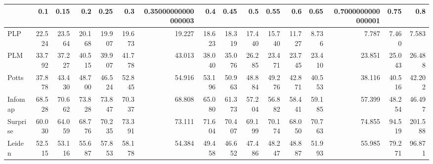\begin{tabular}{lrrrrrrrrrrrrrrr}
\toprule
{} &    0.1 &   0.15 &    0.2 &   0.25 &    0.3 & 0.35000000000000003 &    0.4 &   0.45 &    0.5 &   0.55 &    0.6 &   0.65 & 0.7000000000000001 &   0.75 &     0.8 \\
\midrule
PLP      & 22.524 & 23.564 & 20.168 & 19.907 & 19.673 &              19.227 & 18.623 & 18.319 & 17.440 & 15.740 & 11.727 &  8.736 &              7.787 &  7.460 &   7.583 \\
PLM      & 33.792 & 37.227 & 40.515 & 39.907 & 41.778 &              43.013 & 38.040 & 35.076 & 26.285 & 23.471 & 23.745 & 23.410 &             23.851 & 25.043 &  26.488 \\
Potts    & 37.878 & 43.430 & 48.700 & 46.524 & 52.845 &              54.916 & 53.196 & 50.963 & 48.884 & 49.276 & 42.871 & 40.553 &             38.116 & 40.516 &  42.202 \\
Infomap  & 68.528 & 70.662 & 73.828 & 73.847 & 70.337 &              68.808 & 65.080 & 61.373 & 57.204 & 56.882 & 58.441 & 59.185 &             57.399 & 48.254 &  46.497 \\
Surprise & 60.030 & 64.059 & 68.776 & 70.235 & 73.391 &              73.111 & 71.604 & 70.407 & 69.199 & 70.174 & 68.050 & 70.763 &             74.855 & 94.519 & 201.588 \\
Leiden   & 52.515 & 53.116 & 55.687 & 57.853 & 58.178 &              54.384 & 49.458 & 46.652 & 47.486 & 48.247 & 48.887 & 51.993 &             55.985 & 79.271 &  96.871 \\
\bottomrule
\end{tabular}
